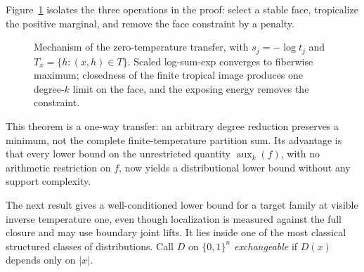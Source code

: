 \documentclass{article}
\newcommand{\bits}{\{0,1\}}
\begin{document}
Figure~\ref{fig:zero-temperature} isolates the three operations in the proof:
select a stable face, tropicalize the positive marginal, and remove the face
constraint by a penalty.
\FloatBarrier
\begin{figure}[!ht]
\centering
{}
\caption{Mechanism of the zero-temperature transfer, with
$s_j=-\log t_j$ and $T_x=\{h:(x,h)\in T\}$.  Scaled log-sum-exp converges to
fiberwise maximum; closedness of the finite tropical image produces one
degree-$k$ limit on the face, and the exposing energy removes the constraint.}
\label{fig:zero-temperature}
\end{figure}
\FloatBarrier

This theorem is a one-way transfer: an arbitrary degree reduction preserves a
minimum, not the complete finite-temperature partition sum.  Its advantage is
that every lower bound on the unrestricted quantity $\operatorname{aux}_k(f)$,
with no arithmetic restriction on $f$, now yields a distributional lower bound
without any support complexity.

The next result gives a well-conditioned lower bound for a target family at
visible inverse temperature one, even though localization is measured against
the full closure and may use boundary joint lifts.  It lies inside one of the
most classical structured classes of distributions.  Call $D$ on $\bits^n$
\emph{exchangeable} if $D(x)$ depends only on $|x|$.
\end{document}
